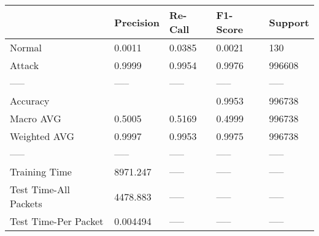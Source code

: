 \begin{tabular}{lllll}
\toprule
{} & Precision & Re-Call & F1-Score & Support \\
\midrule
Normal                &    0.0011 &  0.0385 &   0.0021 &     130 \\
Attack                &    0.9999 &  0.9954 &   0.9976 &  996608 \\
-----                 &     ----- &   ----- &    ----- &   ----- \\
Accuracy              &           &         &   0.9953 &  996738 \\
Macro AVG             &    0.5005 &  0.5169 &   0.4999 &  996738 \\
Weighted AVG          &    0.9997 &  0.9953 &   0.9975 &  996738 \\
-----                 &     ----- &   ----- &    ----- &   ----- \\
Training Time         &  8971.247 &   ----- &    ----- &   ----- \\
Test Time-All Packets &  4478.883 &   ----- &    ----- &   ----- \\
Test Time-Per Packet  &  0.004494 &   ----- &    ----- &   ----- \\
\bottomrule
\end{tabular}
